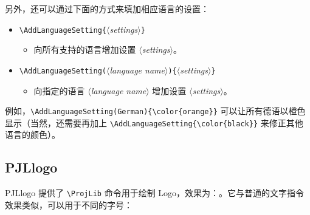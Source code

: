 \documentclass[allowbf,regionalref]{lebhart}
\providecommand{\meta}[1]{$\langle${\normalfont\itshape#1}$\rangle$}
\providecommand{\PJLlogo}{\textsf{PJLlogo}}
\begin{document}
另外，还可以通过下面的方式来填加相应语言的设置：
\begin{itemize}
    \item \lstinline|\AddLanguageSetting{|\meta{settings}\lstinline|}|
    \begin{itemize}
        \item 向所有支持的语言增加设置 \meta{settings}。
    \end{itemize}
    \item \lstinline|\AddLanguageSetting(|\meta{language name}\lstinline|){|\meta{settings}\lstinline|}|
    \begin{itemize}
        \item 向指定的语言 \meta{language name} 增加设置 \meta{settings}。
    \end{itemize}
\end{itemize}
例如，\lstinline|\AddLanguageSetting(German){\color{orange}}| 可以让所有德语以橙色显示（当然，还需要再加上 \lstinline|\AddLanguageSetting{\color{black}}| 来修正其他语言的颜色）。


\subsection{PJLlogo}

\PJLlogo{} 提供了 \lstinline|\ProjLib| 命令用于绘制 Logo，效果为：\ProjLib{}。它与普通的文字指令效果类似，可以用于不同的字号：
\end{document}
